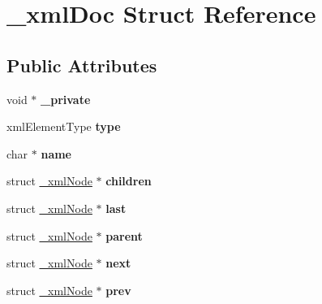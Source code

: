\hypertarget{struct__xml_doc}{}\section{\+\_\+xml\+Doc Struct Reference}
\label{struct__xml_doc}
\subsection*{Public Attributes}
\begin{DoxyCompactItemize}
\item 
\mbox{\label{struct__xml_doc_a50dd4d34840e069af0d520532ba3934b}} 
void $\ast$ {\bfseries \+\_\+private}
\item 
\mbox{\label{struct__xml_doc_aef9fa638a443a4fba932853a17948709}} 
xml\+Element\+Type {\bfseries type}
\item 
\mbox{\label{struct__xml_doc_a2548ebf8d04b23f6de8646769b05057d}} 
char $\ast$ {\bfseries name}
\item 
\mbox{\label{struct__xml_doc_ac7b84a52508e7ba5db5cdb28361bfcea}} 
struct \mbox{\hyperlink{struct__xml_node}{\+\_\+xml\+Node}} $\ast$ {\bfseries children}
\item 
\mbox{\label{struct__xml_doc_a8b4685c311eaf949512c6580da728b91}} 
struct \mbox{\hyperlink{struct__xml_node}{\+\_\+xml\+Node}} $\ast$ {\bfseries last}
\item 
\mbox{\label{struct__xml_doc_a68684ddadacb0eadb84aaf64bed3c22d}} 
struct \mbox{\hyperlink{struct__xml_node}{\+\_\+xml\+Node}} $\ast$ {\bfseries parent}
\item 
\mbox{\label{struct__xml_doc_a12d4bfc0972dc7f9ba3a67f7c4b94aae}} 
struct \mbox{\hyperlink{struct__xml_node}{\+\_\+xml\+Node}} $\ast$ {\bfseries next}
\item 
\mbox{\label{struct__xml_doc_ab4895482a4c47ae0e40b7dfadce94f3d}} 
struct \mbox{\hyperlink{struct__xml_node}{\+\_\+xml\+Node}} $\ast$ {\bfseries prev}
\item 
\mbox{\label{struct__xml_doc_af4449ac87ed04147d6630cf7075f6fc6}} 

\end{DoxyCompactItemize}
